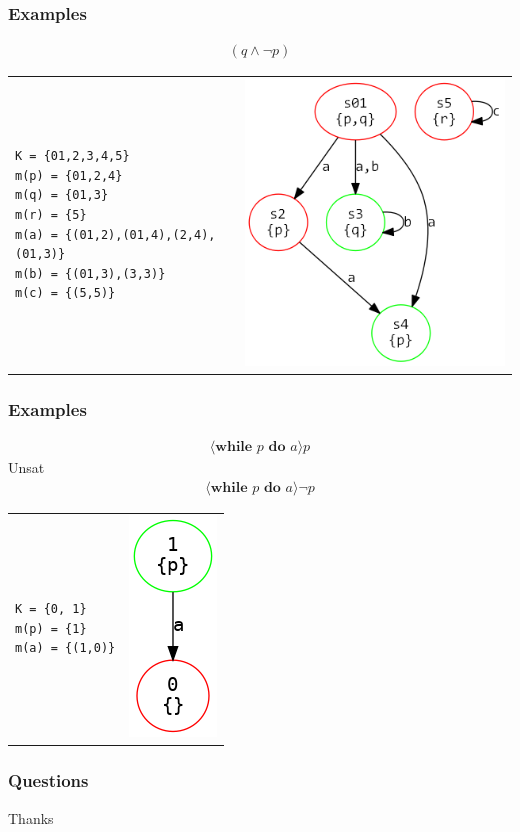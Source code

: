 \documentclass{beamer}
\begin{document}
\begin{frame}[fragile]
\frametitle{Examples}
\small
\begin{align*}
[((a \cup b) \cup c)](q \wedge \neg p)
\end{align*}
\begin{tabular}{ll} 
\begin{lstlisting} 
K = {01,2,3,4,5}
m(p) = {01,2,4}
m(q) = {01,3}
m(r) = {5}
m(a) = {(01,2),(01,4),(2,4),(01,3)}
m(b) = {(01,3),(3,3)}
m(c) = {(5,5)}
\end{lstlisting} &
\includegraphics[scale=0.3]{example2.png}
\end{tabular}
\end{frame}

\begin{frame}[fragile]
\frametitle{Examples}
\small
\begin{align*}
\langle \textbf{while } p\textbf{ do }a \rangle p
\end{align*}
Unsat
\begin{align*}
\langle \textbf{while } p\textbf{ do }a \rangle \neg p
\end{align*}
\begin{tabular}{ll} 
\begin{lstlisting} 
K = {0, 1}
m(p) = {1}
m(a) = {(1,0)}
\end{lstlisting} &
\includegraphics[scale=0.3]{while.png}
\end{tabular}
\end{frame}

\begin{frame}[fragile]
\frametitle{Questions}
\huge
\centering

Thanks

\end{frame}
\end{document}
